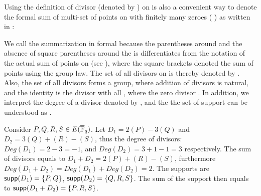 


Using the definition of divisor (denoted by \mathFormulaDivisor ) on  is also a convenient way to denote the formal sum of multi-set of points on  with finitely many zeroes ( ) as written in : 


We call the summarization in  formal because the parentheses  around  and the absence of square parentheses around the   is differentiates from the notation of the actual sum of points on  (see  ), where the square brackets denoted the sum of points using the group law.  The set of all divisors on  is thereby denoted by . Also, the set of all divisors forms a group, where addition of divisors is natural, and the identity is the
divisor with all  , where the zero divisor  
.    In addition, we interpret the degree of a divisor  denoted by \EquationDegreeOfDivisor, and the 
the set of support can be understood as .

\begin{example}
	Consider $P,Q,R,S \in E(\overline{\mathbb{F}}_q)$. Let $D_1 = 2(P) - 3(Q)$ and $D_2 = 3(Q) + (R) - (S)$, thus the degree of divisors: $Deg(D_1) = 2-3=-1$, and $Deg(D_2) = 3+1 -1 = 3$ respectively. The sum of divisors equals to $D_1 + D_2 = 2(P) + (R) - (S)$, furthermore $Deg(D_1 + D_2) = Deg(D_1) + Deg(D_2) = 2$. The supports are $ \mathsf{supp}({D_1}) = \{P,Q\}$, $ \mathsf{supp}({D_2}) = \{Q,R,S\}$. The sum of the support  then equals to $ \mathsf{supp}({D_1 + D_2}) = \{P,R,S\}$.
\label{example:divisorsupportsum}	
\end{example}


